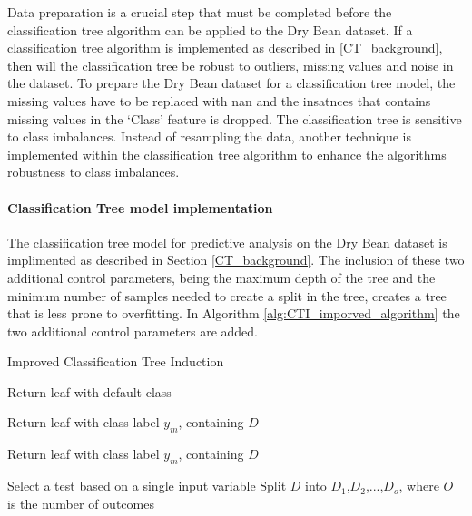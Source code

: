 \documentclass[10pt, conference]{IEEEtran}
\begin{document}
Data preparation is a crucial step that must be completed before the classification tree algorithm can be applied to the
Dry Bean dataset. If a classification tree algorithm is implemented as described in \ref{CT_background}, then will
the classification tree be robust to outliers, missing values and noise in the dataset.
To prepare the Dry Bean dataset for a classification tree model, the missing values have to be replaced
with \acrshort{nan} and the insatnces that contains missing values in the `Class' feature is dropped. The
classification tree is sensitive to class imbalances. Instead of resampling the data, another technique is implemented
within the classification tree algorithm to enhance the algorithms robustness to class imbalances.

\paragraph{Classification Tree model implementation}

The classification tree model for predictive analysis on the Dry Bean dataset is implimented as described
in Section \ref{CT_background}. The inclusion of these two additional control parameters, being the maximum depth of the tree
and the minimum number of samples needed to create a split in the tree, creates a tree that is less prone to
overfitting. In Algorithm \ref{alg:CTI_imporved_algorithm} the two additional control parameters are added.
\begin{algorithm}[H]
    \caption{Improved Classification Tree Induction}
    \label{alg:CTI_imporved_algorithm}
    \begin{algorithmic}[1]
                \State Return leaf with default class
            \EndIf
            
                \State Return leaf with class label $y_m$, containing $D$
            \EndIf

                \State Return leaf with class label $y_m$, containing $D$
            \EndIf

            \State Select a test based on a single input variable
            \State Split $D$ into $D_1$,$D_2$,...,$D_o$, where $O$ is the number of outcomes
                \State {}
            \EndFor
        \EndFunction
    \end{algorithmic}
\end{algorithm}
\end{document}
